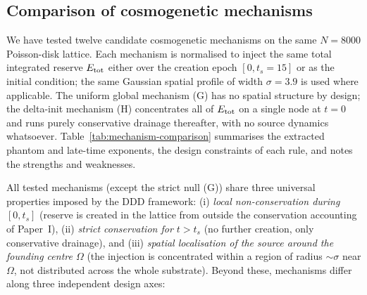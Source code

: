 \documentclass[11pt,a4paper]{article}
\begin{document}
\subsection{Comparison of cosmogenetic mechanisms}
\label{sec:mechanism-comparison}

We have tested twelve candidate cosmogenetic mechanisms on the same
$N=8000$ Poisson-disk lattice. Each mechanism is normalised to inject
the same total integrated reserve $E_{\rm tot}$ either over the
creation epoch $[0, t_s = 15]$ or as the initial condition; the same
Gaussian spatial profile of width $\sigma = 3.9$ is used where
applicable. The uniform global mechanism (G) has no spatial structure
by design; the delta-init mechanism (H) concentrates all of
$E_{\rm tot}$ on a single node at $t=0$ and runs purely conservative
drainage thereafter, with no source dynamics whatsoever. Table~\ref{tab:mechanism-comparison} summarises the
extracted phantom and late-time exponents, the design constraints of
each rule, and notes the strengths and weaknesses.

All tested mechanisms (except the strict null (G)) share three
universal properties imposed by the DDD framework: (i) \emph{local
non-conservation during $[0, t_s]$} (reserve is created in the
lattice from outside the conservation accounting of Paper~I),
(ii) \emph{strict conservation for $t > t_s$} (no further creation,
only conservative drainage), and (iii) \emph{spatial localisation of
the source around the founding centre $\Omega$} (the injection is
concentrated within a region of radius $\sim \sigma$ near $\Omega$,
not distributed across the whole substrate). Beyond these,
mechanisms differ along three independent design axes:
\end{document}
